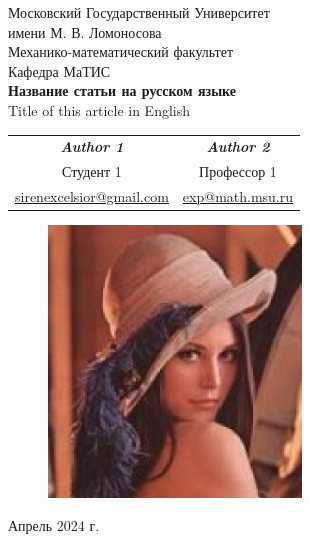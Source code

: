\documentclass[a4paper,12pt]{article}
\begin{document}
\begin{titlepage}
\thispagestyle{empty}
\centering
\vspace*{1cm}
{\LARGE Московский Государственный Университет \\ имени М. В. Ломоносова \\ Механико-математический факультет \\ Кафедра МаТИС \\[2cm]}
\textbf{\huge Название статьи на русском языке}\\[0.5cm]
{\large Title of this article in English}\\[1.5cm]

{\large
\begin{tabular}{cc}
  \textit{\textbf{Author 1}} & \textit{\textbf{Author 2}}\\
  Студент 1 & Профессор 1\\
  \href{mailto:sirenexcelsior@gmail.com}{sirenexcelsior@gmail.com} & \href{mailto:exp@math.msu.ru}{exp@math.msu.ru}\\
\end{tabular}}

\vfill

\begin{figure}[htbp]
   \centering
   \includegraphics[width=0.6\textwidth]{pic/pic}
\end{figure}

\vfill

\large Апрель 2024 г.

\end{titlepage}

\large

\newpage
\thispagestyle{empty}
\tableofcontents

\newpage
\setcounter{page}{1}


\newpage


\newpage




\end{document}
